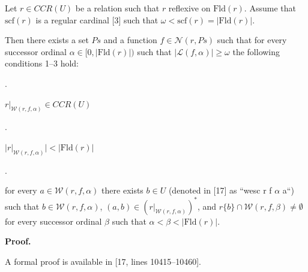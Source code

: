  
Let $r\in CCR(U)$ be a relation such that $r$ reflexive on $\mathrm{Fld}(r)$. Assume that $\mathrm{scf}(r)$ is a regular cardinal [3] such that $\omega<\mathrm{scf}(r)=|\mathrm{Fld}(r)|$.\par
 
 
 
Then there exists a set $Ps$ and a function $f\in\mathcal{N}(r,Ps)$ such that for every successor ordinal $\alpha\in[0,|\mathrm{Fld}(r)|)$ such that $|\mathcal{L}(f,\alpha)|\geq\omega$ the following conditions 1–3 hold:\par
  
\par{}. 
 
$r|_{\mathcal{W}(r,f,\alpha)}\in CCR(U)$\par
 
 
 
\par{}. 
 
$|r|_{\mathcal{W}(r,f,\alpha)}|<|\mathrm{Fld}(r)|$\par
 
 
 
\par{}. 
 
for every $a\in\mathcal{W}(r,f,\alpha)$ there exists $b\in U$ (denoted in [17] as “wesc r f $\alpha$ a“) such that $b\in\mathcal{W}(r,f,\alpha)$, $(a,b)\in(r|_{\mathcal{W}(r,f,\alpha)})^{*}$, and $r\{b\}\cap\mathcal{W}(r,f,\beta)\neq\emptyset$ for every successor ordinal $\beta$ such that $\alpha<\beta<|\mathrm{Fld}(r)|$.\par
 
 
  
 
 
 
\par\medskip\noindent\textbf{Proof.}\par
 
 
A formal proof is available in [17, lines 10415–10460].\par
 
 

